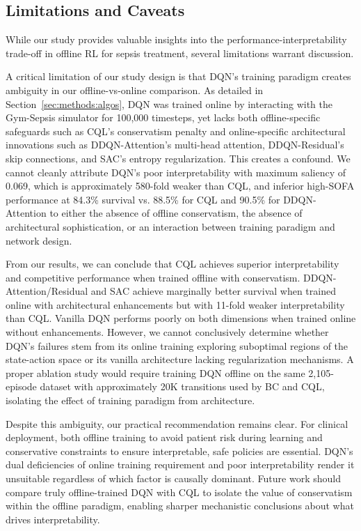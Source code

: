 \subsection{Limitations and Caveats}\label{sec:discussion:limitations}

While our study provides valuable insights into the performance-interpretability trade-off in offline RL for sepsis treatment, several limitations warrant discussion.

A critical limitation of our study design is that DQN's training paradigm creates ambiguity in our offline-vs-online comparison. As detailed in Section~\ref{sec:methods:algos}, DQN was trained online by interacting with the Gym-Sepsis simulator for 100,000 timesteps, yet lacks both offline-specific safeguards such as CQL's conservatism penalty and online-specific architectural innovations such as DDQN-Attention's multi-head attention, DDQN-Residual's skip connections, and SAC's entropy regularization. This creates a confound. We cannot cleanly attribute DQN's poor interpretability with maximum saliency of 0.069, which is approximately 580-fold weaker than CQL, and inferior high-SOFA performance at 84.3\% survival vs. 88.5\% for CQL and 90.5\% for DDQN-Attention to either the absence of offline conservatism, the absence of architectural sophistication, or an interaction between training paradigm and network design.

From our results, we can conclude that CQL achieves superior interpretability and competitive performance when trained offline with conservatism. DDQN-Attention/Residual and SAC achieve marginally better survival when trained online with architectural enhancements but with 11-fold weaker interpretability than CQL. Vanilla DQN performs poorly on both dimensions when trained online without enhancements. However, we cannot conclusively determine whether DQN's failures stem from its online training exploring suboptimal regions of the state-action space or its vanilla architecture lacking regularization mechanisms. A proper ablation study would require training DQN offline on the same 2,105-episode dataset with approximately 20K transitions used by BC and CQL, isolating the effect of training paradigm from architecture.

Despite this ambiguity, our practical recommendation remains clear. For clinical deployment, both offline training to avoid patient risk during learning and conservative constraints to ensure interpretable, safe policies are essential. DQN's dual deficiencies of online training requirement and poor interpretability render it unsuitable regardless of which factor is causally dominant. Future work should compare truly offline-trained DQN with CQL to isolate the value of conservatism within the offline paradigm, enabling sharper mechanistic conclusions about what drives interpretability.

